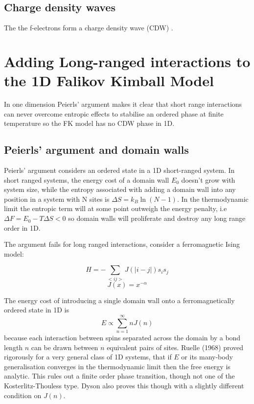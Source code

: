 \documentclass[a4paper, 11pt, onecolumn]{article}
\begin{document}
\subsection{Charge density waves}
The the f-electrons form a charge density wave (CDW) \cite{antipov_interaction-tuned_2016,herrmann_spreading_2018}.

\section{Adding Long-ranged interactions to the 1D Falikov Kimball Model}

In one dimension Peierls' argument \cite{peierls_isings_1936, kennedy_itinerant_1986} makes it clear that short range interactions can never overcome entropic effects to stabilise an ordered phase at finite temperature so the FK model has no CDW phase in 1D.

\subsection{Peierls' argument and domain walls}
Peierls' argument considers an ordered state in a 1D short-ranged system. In short ranged systems, the energy cost of a domain wall $E_0$ doesn't grow with system size, while the entropy associated with adding a domain wall into any position in a system with N sites is $\Delta S = k_B \ln (N - 1)$. 
In the thermodynamic limit the entropic term will at some point outweigh the energy penalty, i.e $\Delta F = E_0 - T\Delta S < 0$ so domain walls will proliferate and destroy any long range order in 1D.

The argument fails for long ranged interactions, consider a ferromagnetic Ising model:
\begin{multicols}{2}
\noindent
  \begin{equation*}
    H = - \sum_{<ij>} J(|i-j|) s_i s_j
  \end{equation*}
  \begin{equation*}
    J(x) = x^{-\alpha}
  \end{equation*}
\end{multicols}

The energy cost of introducing a single domain wall onto a ferromagnetically ordered state in 1D is 
$$E \propto \sum_{n=1}^{\infty} n J(n)$$
because each interaction between spins separated across the domain by a bond length $n$ can be drawn between $n$ equivalent pairs of sites. Ruelle (1968) \cite{ruelle_statistical_1968} proved rigorously for a very general class of 1D systems, that if $E$ or its many-body generalisation converges in the thermodynamic limit then the free energy is analytic. This rules out a finite order phase transition, though not one of the Kosterlitz-Thouless type. Dyson \cite{dyson_existence_1969} also proves this though with a slightly different condition on $J(n)$.
\end{document}
